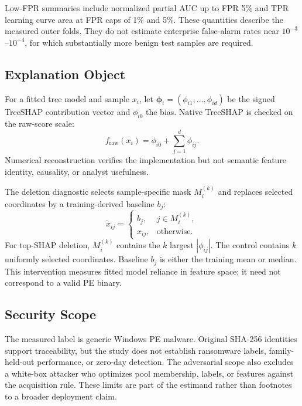 Low-FPR summaries include normalized partial AUC up to FPR 5\% and TPR learning
curve area at FPR caps of 1\% and 5\%. These quantities describe the measured
outer folds. They do not estimate enterprise false-alarm rates near
$10^{-3}$--$10^{-4}$, for which substantially more benign test samples are
required.

\subsection{Explanation Object}

For a fitted tree model and sample $x_i$, let
$\boldsymbol{\phi}_i=(\phi_{i1},\ldots,\phi_{id})$ be the signed TreeSHAP
contribution vector and $\phi_{i0}$ the bias. Native TreeSHAP is checked on the
raw-score scale:
\begin{equation}
f_{\mathrm{raw}}(x_i)=\phi_{i0}+\sum_{j=1}^{d}\phi_{ij}.
\label{eq:additivity}
\end{equation}
Numerical reconstruction verifies the implementation but not semantic feature
identity, causality, or analyst usefulness.

The deletion diagnostic selects sample-specific mask $M_i^{(k)}$ and replaces
selected coordinates by a training-derived baseline $b_j$:
\begin{equation}
\widetilde{x}_{ij}=\begin{cases}
b_j,&j\in M_i^{(k)},\\
x_{ij},&\text{otherwise}.
\end{cases}
\label{eq:mask}
\end{equation}
For top-SHAP deletion, $M_i^{(k)}$ contains the $k$ largest
$|\phi_{ij}|$. The control contains $k$ uniformly selected coordinates. Baseline
$b_j$ is either the training mean or median. This intervention measures fitted
model reliance in feature space; it need not correspond to a valid PE binary.

\subsection{Security Scope}

The measured label is generic Windows PE malware. Original SHA-256 identities
support traceability, but the study does not establish ransomware labels,
family-held-out performance, or zero-day detection. The adversarial scope also
excludes a white-box attacker who optimizes pool membership, labels, or features
against the acquisition rule. These limits are part of the estimand rather than
footnotes to a broader deployment claim.
